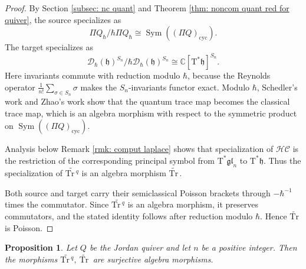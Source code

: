 \documentclass[11pt,reqno]{amsart}
\newtheorem{proposition}[theorem]{Proposition}
\theoremstyle{definition}
\newcommand{\bbC}{\mathbb{C}}
\newcommand{\gl}{\mathfrak{gl}}
\newcommand{\Tr}{\mathrm{Tr} \,}
\newcommand{\mD}{\mathcal{D}}
\newcommand{\cyc}{\mathrm{cyc}}
\newcommand{\Sym}{\operatorname{Sym}}
\newcommand{\fkh}{\mathfrak{h}}
\newcommand{\hc}{\mathcal{HC}}
\newcommand{\rmT}{\mathrm{T}}
\newcommand{\tTr}{\widetilde{\Tr}}
\begin{document}
\begin{proof}
By Section \ref{subsec: nc quant} and Theorem \ref{thm: noncom quant red for quiver}, the source specializes as
\[
\Pi Q_{\hbar}/\hbar\Pi Q_{\hbar}
\cong
\Sym((\Pi Q)_\cyc).
\]
The target specializes as
\[
\mD_\hbar(\fkh)^{S_n}/\hbar\mD_\hbar(\fkh)^{S_n}
\cong
\bbC[\rmT^\ast\fkh]^{S_n}.
\]
Here invariants commute with reduction modulo \(\hbar\), because the
Reynolds operator \(\frac1{n!}\sum_{\sigma\in S_n}\sigma\) makes the
\(S_n\)-invariants functor exact.
Modulo \(\hbar\), Schedler's work \cite{Sch2005} and Zhao's work \cite{Zhao2023Non} show that the quantum trace map becomes the classical trace map,
which is an algebra morphism with respect to the symmetric product on
\(\Sym((\Pi Q)_\cyc)\).

Analysis below Remark \ref{rmk: comput laplace} shows that specialization of \(\hc\) is the restriction of the corresponding principal symbol from \(\rmT^\ast\gl_n\) to \(\rmT^\ast\fkh\).
Thus the specialization of \(\widetilde{\Tr^q}\) is an algebra morphism \(\tTr\).



Both source and target carry their semiclassical Poisson brackets
through \(-\hbar^{-1}\) times the commutator. Since
\(\widetilde{\Tr^q}\) is an algebra morphism, it preserves
commutators, and the stated identity follows after reduction modulo
\(\hbar\). Hence \(\widetilde{\Tr}\) is Poisson.
\end{proof}


\begin{proposition}\label{prop: tTr surj}
Let \(Q\) be the Jordan quiver and let \(n\) be a positive integer.
Then the morphisms
	\(\widetilde{\Tr^q},\ \widetilde{\Tr}\) are surjective algebra morphisms.
\end{proposition}
\end{document}
